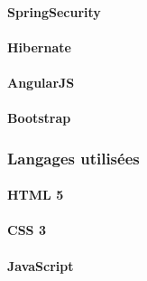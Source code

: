 \paragraph{SpringSecurity \\}


\paragraph{Hibernate \\}

\paragraph{AngularJS \\}
\paragraph{Bootstrap \\}

\subsubsection{Langages utilisées}
\paragraph{HTML 5}
\paragraph{CSS 3}
\paragraph{JavaScript}



